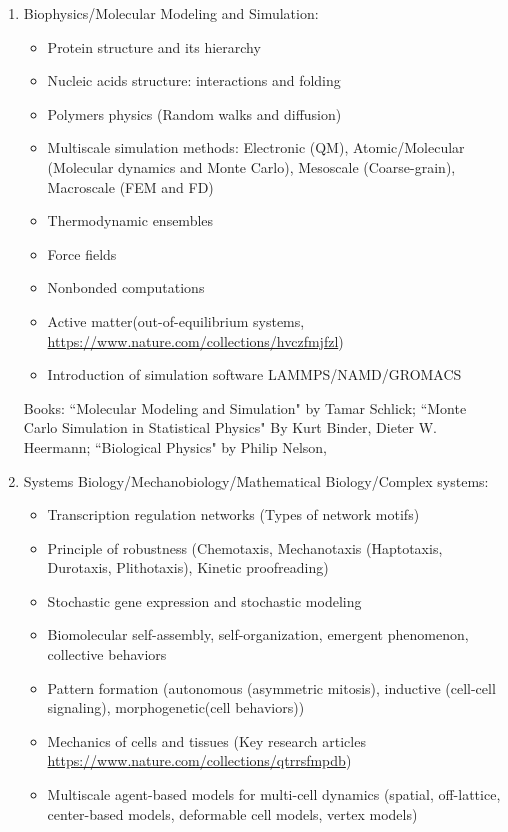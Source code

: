 \documentclass{res}
\begin{document}
\begin{resume}
\begin{itemize}
\begin{enumerate}
\item Biophysics/Molecular Modeling and Simulation: 
    \begin{itemize}
        \item Protein structure and its hierarchy 
        \item Nucleic acids structure: interactions and folding 
        \item Polymers physics (Random walks and diffusion)    
        \item Multiscale simulation methods: Electronic (QM), Atomic/Molecular (Molecular dynamics and Monte Carlo), Mesoscale (Coarse-grain), Macroscale (FEM and FD)  
        \item Thermodynamic ensembles 
        \item Force fields 
        \item Nonbonded computations 
        \item Active matter(out-of-equilibrium systems, \url{https://www.nature.com/collections/hvczfmjfzl})
        \item Introduction of simulation software LAMMPS/NAMD/GROMACS  
    \end{itemize}
Books: ``Molecular Modeling and Simulation" by  Tamar Schlick;  ``Monte Carlo Simulation in Statistical Physics" By Kurt Binder, Dieter W. Heermann; ``Biological Physics" by Philip Nelson,
\item Systems Biology/Mechanobiology/Mathematical Biology/Complex systems:
    \begin{itemize}
        \item Transcription regulation networks (Types of network motifs) 
        \item Principle of robustness (Chemotaxis, Mechanotaxis (Haptotaxis, Durotaxis, Plithotaxis), Kinetic proofreading)
        \item  Stochastic gene expression and stochastic modeling 
        \item Biomolecular self-assembly, self-organization, emergent phenomenon, collective behaviors
        \item Pattern formation (autonomous (asymmetric mitosis), inductive (cell-cell signaling), morphogenetic(cell behaviors))
        \item Mechanics of cells and tissues (Key research articles \url{https://www.nature.com/collections/qtrrsfmpdb})
        \item Multiscale agent-based models for multi-cell dynamics (spatial, off-lattice, center-based models, deformable cell models, vertex models)  

\end{itemize}
\end{enumerate}
\end{itemize}
\end{resume}
\end{document}
